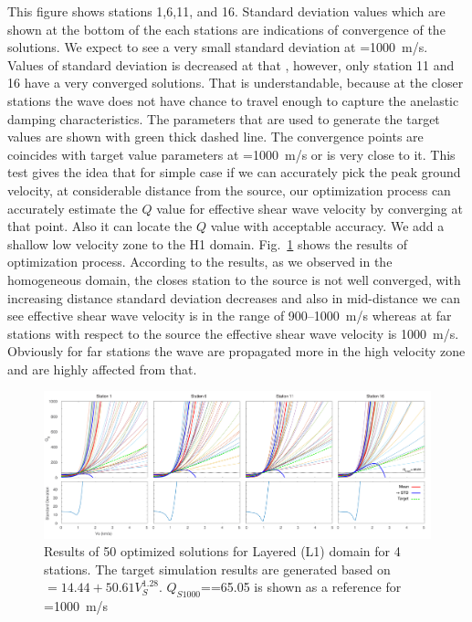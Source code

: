 This figure shows stations 1,6,11, and 16. Standard deviation values which are shown at the bottom of the each stations are indications of convergence of the solutions. We expect to see a very small standard deviation at \vs{}=1000~m/s. Values of standard deviation is decreased at that \vs{}, however,  only station 11 and 16 have a very converged solutions. That is understandable, because at the closer stations the wave does not have chance to travel enough to capture the anelastic damping characteristics. The parameters that are used to generate the target values are shown with green thick dashed line. The convergence points are coincides with target value parameters at \vs{}=1000~m/s or is very close to it. This test gives the idea that for simple case if we can accurately pick the peak ground velocity, at considerable distance from the source, our optimization process can accurately estimate the $Q$ value for effective shear wave velocity by converging at that point. Also it can locate the $Q$ value with acceptable accuracy.
We add a shallow low velocity zone to the H1 domain. Fig.~\ref{fig:station_1_1000_500_L1} shows the results of optimization process. According to the results, as we observed in the homogeneous domain, the closes station to the source is not well converged, with increasing distance standard deviation decreases and also in mid-distance we can see effective shear wave velocity is in the range of 900--1000~m/s whereas at far stations with respect to the source the effective shear wave velocity is 1000~m/s. Obviously for far stations the wave are propagated more in the high velocity zone and are highly affected from that.   

  \begin{figure}[ht]
    \centering
    \includegraphics[width=\textwidth]{figures/pdf/Figure_15-L1-pgv.pdf}
    \caption{Results of 50 optimized solutions for Layered (L1) domain for 4 stations.  The target simulation results are generated based on \qs{}$=14.44+50.61V_{S}^{1.28}$. $Q_{S1000}$==65.05 is shown as a reference for \vs{}=1000~m/s}
    \label{fig:station_1_1000_500_L1}
\end{figure}

